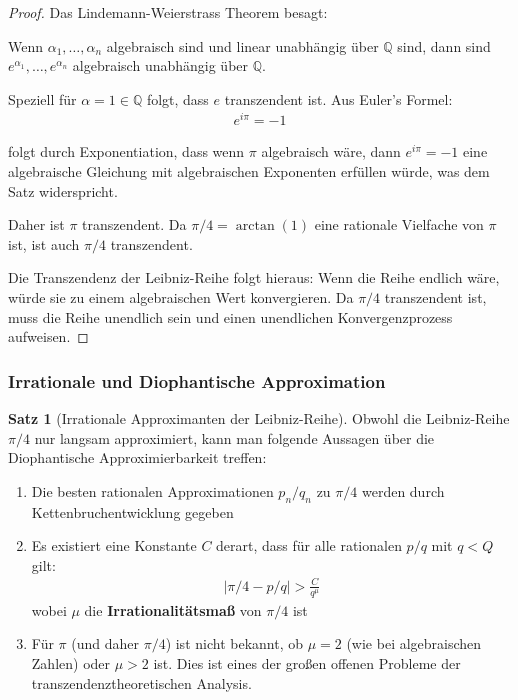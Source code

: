\documentclass[a4paper,12pt,twoside]{report}
\theoremstyle{definition}
\newtheorem{satz}{Satz}
\begin{document}
\begin{proof}
Das Lindemann-Weierstrass Theorem besagt:

Wenn $\alpha_1, \ldots, \alpha_n$ algebraisch sind und linear unabhängig über $\mathbb{Q}$ sind, dann sind $e^{\alpha_1}, \ldots, e^{\alpha_n}$ algebraisch unabhängig über $\mathbb{Q}$.

Speziell für $\alpha = 1 \in \mathbb{Q}$ folgt, dass $e$ transzendent ist. Aus Euler's Formel:
\begin{align}
	e^{i\pi} = -1
\end{align}

folgt durch Exponentiation, dass wenn $\pi$ algebraisch wäre, dann $e^{i\pi} = -1$ eine algebraische Gleichung mit algebraischen Exponenten erfüllen würde, was dem Satz widerspricht.

Daher ist $\pi$ transzendent. Da $\pi/4 = \arctan(1)$ eine rationale Vielfache von $\pi$ ist, ist auch $\pi/4$ transzendent.

Die Transzendenz der Leibniz-Reihe folgt hieraus: Wenn die Reihe endlich wäre, würde sie zu einem algebraischen Wert konvergieren. Da $\pi/4$ transzendent ist, muss die Reihe unendlich sein und einen unendlichen Konvergenzprozess aufweisen.
\end{proof}

\subsubsection{Irrationale und Diophantische Approximation}

\begin{satz}[Irrationale Approximanten der Leibniz-Reihe]
Obwohl die Leibniz-Reihe $\pi/4$ nur langsam approximiert, kann man folgende Aussagen über die Diophantische Approximierbarkeit treffen:

\begin{enumerate}
	\item Die besten rationalen Approximationen $p_n/q_n$ zu $\pi/4$ werden durch Kettenbruchentwicklung gegeben
	
	\item Es existiert eine Konstante $C$ derart, dass für alle rationalen $p/q$ mit $q < Q$ gilt:
	\begin{align}
		\left| \pi/4 - p/q \right| > \frac{C}{q^{\mu}}
	\end{align}
	wobei $\mu$ die \textbf{Irrationalitätsmaß} von $\pi/4$ ist
	
	\item Für $\pi$ (und daher $\pi/4$) ist nicht bekannt, ob $\mu = 2$ (wie bei algebraischen Zahlen) oder $\mu > 2$ ist. Dies ist eines der großen offenen Probleme der transzendenztheoretischen Analysis.
\end{enumerate}
\end{satz}
\end{document}
